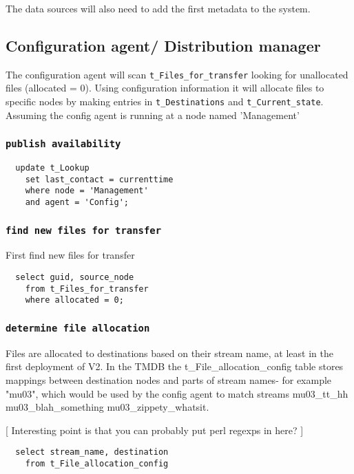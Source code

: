 \documentclass{cmspaper}
\begin{document}
The data sources will also need to add the first metadata to the system.

\subsection{Configuration agent/ Distribution manager}

The configuration agent will scan \texttt{t\_Files\_for\_transfer}
looking for unallocated files (allocated = 0).  Using configuration
information it will allocate files to specific nodes by making entries
in \texttt{t\_Destinations} and \texttt{t\_Current\_state}. Assuming the config agent is running at a node named 'Management'

\subsubsection{\textbf{\texttt{publish availability}}}

{\small\begin{verbatim}
  update t_Lookup
    set last_contact = currenttime
    where node = 'Management'
    and agent = 'Config';
\end{verbatim}}

\subsubsection{\textbf{\texttt{find new files for transfer}}}
First find new files for transfer

{\small\begin{verbatim}
  select guid, source_node
    from t_Files_for_transfer
    where allocated = 0;
\end{verbatim}}

\subsubsection{\textbf{\texttt{determine file allocation}}}
Files are allocated to destinations based on their stream name, at least in the first deployment of V2. In the TMDB the t\_File\_allocation\_config table stores mappings between destination nodes and parts of stream names- for example "mu03", which would be used by the config agent to match streams mu03\_tt\_hh mu03\_blah\_something mu03\_zippety\_whatsit.

[ Interesting point is that you can probably put perl regexps in here? ]

{\small\begin{verbatim}
  select stream_name, destination
    from t_File_allocation_config
\end{verbatim}}
\end{document}
